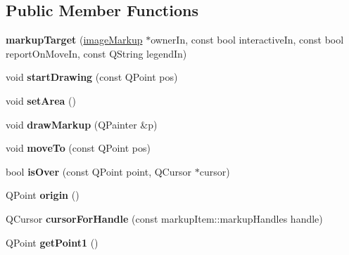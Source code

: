 \subsection*{Public Member Functions}
\begin{DoxyCompactItemize}
\item 
\hypertarget{classmarkupTarget_ad3480eb31ea67d4469c550363bf56146}{
{\bfseries markupTarget} (\hyperlink{classimageMarkup}{imageMarkup} $\ast$ownerIn, const bool interactiveIn, const bool reportOnMoveIn, const QString legendIn)}
\label{classmarkupTarget_ad3480eb31ea67d4469c550363bf56146}

\item 
\hypertarget{classmarkupTarget_affa4280c71754c2b7c103b29325eb661}{
void {\bfseries startDrawing} (const QPoint pos)}
\label{classmarkupTarget_affa4280c71754c2b7c103b29325eb661}

\item 
\hypertarget{classmarkupTarget_a14e4eb2ccb3d466c9e01aa54e79d1261}{
void {\bfseries setArea} ()}
\label{classmarkupTarget_a14e4eb2ccb3d466c9e01aa54e79d1261}

\item 
\hypertarget{classmarkupTarget_ad266b53ab93d38cbb713ccf0036e5ae2}{
void {\bfseries drawMarkup} (QPainter \&p)}
\label{classmarkupTarget_ad266b53ab93d38cbb713ccf0036e5ae2}

\item 
\hypertarget{classmarkupTarget_a24a4d8eaee3de1c740bf01d70facd509}{
void {\bfseries moveTo} (const QPoint pos)}
\label{classmarkupTarget_a24a4d8eaee3de1c740bf01d70facd509}

\item 
\hypertarget{classmarkupTarget_a58b8c80bc2f1eb7a02128559e0b98393}{
bool {\bfseries isOver} (const QPoint point, QCursor $\ast$cursor)}
\label{classmarkupTarget_a58b8c80bc2f1eb7a02128559e0b98393}

\item 
\hypertarget{classmarkupTarget_ade04074ff72727dcad49232e5061be49}{
QPoint {\bfseries origin} ()}
\label{classmarkupTarget_ade04074ff72727dcad49232e5061be49}

\item 
\hypertarget{classmarkupTarget_a6b2b40319837264553c878bac3f65c3a}{
QCursor {\bfseries cursorForHandle} (const markupItem::markupHandles handle)}
\label{classmarkupTarget_a6b2b40319837264553c878bac3f65c3a}

\item 
\hypertarget{classmarkupTarget_a28ef1e83cefc656c79ac1adbdac2e0c6}{
QPoint {\bfseries getPoint1} ()}
\label{classmarkupTarget_a28ef1e83cefc656c79ac1adbdac2e0c6}


\end{DoxyCompactItemize}
